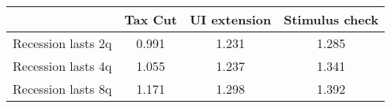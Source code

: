 \begin{tabular}{@{}lccc@{}}
\toprule
& Tax Cut    & UI extension    & Stimulus check    \\  \midrule
Recession lasts 2q &0.991  & 1.231  & 1.285     \\
Recession lasts 4q &1.055  & 1.237  & 1.341     \\
Recession lasts 8q &1.171  & 1.298  & 1.392     \\
\end{tabular}
